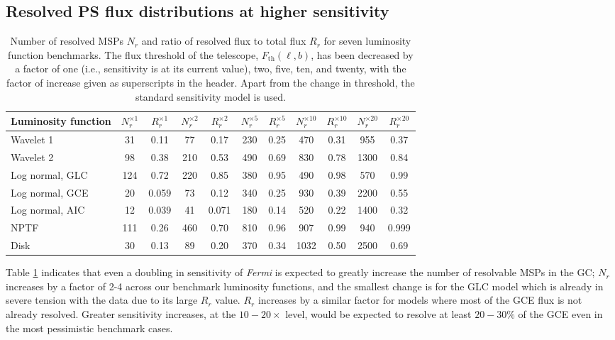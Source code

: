 \documentclass[letter,11pt]{article}
\begin{document}
\subsection{Resolved PS flux distributions at higher sensitivity}

\begin{table}[t]
    \centering
    \small
    \begin{tabular}{|l | c c | c c | c c | c c | c c |}
        \hline
        Luminosity function & $N_r^{\times 1}$ & $R_r^{\times 1}$ & $N_r^{\times 2}$ & $R_r^{\times 2}$ & $N_r^{\times 5}$ & $R_r^{\times 5}$ & $N_r^{\times 10}$ & $R_r^{\times 10}$ & $N_r^{\times 20}$ & $R_r^{\times 20}$\\ \hline \hline
        Wavelet 1 & 31 & 0.11 & 77 & 0.17 & 230 & 0.25 & 470 & 0.31 & 955 & 0.37 \\
        Wavelet 2 & 98 & 0.38 & 210 & 0.53 & 490 & 0.69 & 830 & 0.78 & 1300 & 0.84 \\
        Log normal, GLC & 124 & 0.72 & 220 & 0.85 & 380 & 0.95 & 490 & 0.98 & 570 & 0.99 \\
        Log normal, GCE & 20 & 0.059 & 73 & 0.12 & 340 & 0.25 & 930 & 0.39 & 2200 & 0.55\\
        Log normal, AIC & 12 & 0.039 & 41 & 0.071 &180 & 0.14 & 520 & 0.22 & 1400 & 0.32\\
        NPTF & 111 & 0.26 & 460 & 0.70 & 810 & 0.96 & 907 & 0.99 & 940 & 0.999 \\
        Disk & 30 & 0.13 & 89 & 0.20 & 370 & 0.34 & 1032 & 0.50 & 2500 & 0.69 \\
        \hline
    \end{tabular}
    \caption{Number of resolved MSPs $N_r$ and ratio of resolved flux to total flux $R_r$ for seven luminosity function benchmarks. The flux threshold of the telescope, $F_\text{th}(\ell, b)$, has been decreased by a factor of one (i.e., sensitivity is at its current value), two, five, ten, and twenty, with the factor of increase given as superscripts in the header. Apart from the change in threshold, the standard sensitivity model is used.}
    \label{tab:sensitivity-values}
\end{table}

Table \ref{tab:sensitivity-values} indicates that even a doubling in sensitivity of \textit{Fermi} is expected to greatly increase the number of resolvable MSPs in the GC; $N_r$ increases by a factor of 2-4 across our benchmark luminosity functions, and the smallest change is for the GLC model which is already in severe tension with the data due to its large $R_r$ value. $R_r$ increases by a similar factor for models where most of the GCE flux is not already resolved. Greater sensitivity increases, at the $10-20\times$ level, would be expected to resolve at least $20-30\%$ of the GCE even in the most pessimistic benchmark cases.
\end{document}
